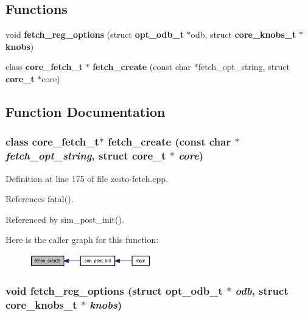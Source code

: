 \subsection*{Functions}
\begin{CompactItemize}
\item 
void {\bf fetch\_\-reg\_\-options} (struct {\bf opt\_\-odb\_\-t} $\ast$odb, struct {\bf core\_\-knobs\_\-t} $\ast${\bf knobs})
\item 
class {\bf core\_\-fetch\_\-t} $\ast$ {\bf fetch\_\-create} (const char $\ast$fetch\_\-opt\_\-string, struct {\bf core\_\-t} $\ast$core)
\end{CompactItemize}


\subsection{Function Documentation}
\subsubsection[{fetch\_\-create}]{\setlength{\rightskip}{0pt plus 5cm}class {\bf core\_\-fetch\_\-t}$\ast$ fetch\_\-create (const char $\ast$ {\em fetch\_\-opt\_\-string}, \/  struct {\bf core\_\-t} $\ast$ {\em core})}\label{zesto-fetch_8cpp_9dabdc921dc59e593201a9d42ee1fc63}




Definition at line 175 of file zesto-fetch.cpp.

References fatal().

Referenced by sim\_\-post\_\-init().

Here is the caller graph for this function:\nopagebreak
\begin{figure}[H]
\begin{center}
\leavevmode
\includegraphics[width=149pt]{zesto-fetch_8cpp_9dabdc921dc59e593201a9d42ee1fc63_icgraph}
\end{center}
\end{figure}
\subsubsection[{fetch\_\-reg\_\-options}]{\setlength{\rightskip}{0pt plus 5cm}void fetch\_\-reg\_\-options (struct {\bf opt\_\-odb\_\-t} $\ast$ {\em odb}, \/  struct {\bf core\_\-knobs\_\-t} $\ast$ {\em knobs})}\label{zesto-fetch_8cpp_45135765b04df4e9a637178a374e6b9d}




